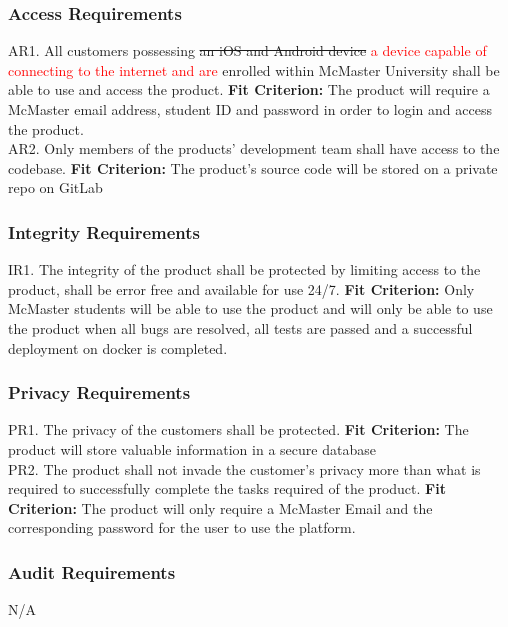 \documentclass[12pt, titlepage]{article}
\begin{document}
\subsubsection{Access Requirements}

AR1. All customers possessing \sout{an iOS and Android device} \textcolor{red}{a device capable of connecting to the internet and are} enrolled within McMaster University shall be able to use and access the product.
	\textbf{Fit Criterion:} The product will require a McMaster email address, student ID and password in order to login and access the product. \\

\noindent AR2. Only members of the products’ development team shall have access to the codebase.
	\textbf{Fit Criterion:} The product’s source code will be stored on a private repo on GitLab

\subsubsection{Integrity Requirements}

IR1. The integrity of the product shall be protected by limiting access to the product, shall be error free and available for use 24/7.
	\textbf{Fit Criterion:} Only McMaster students will be able to use the product and will only be able to use the product when all bugs are resolved, all tests are passed and a successful deployment on docker is completed.

\subsubsection{Privacy Requirements}

PR1. The privacy of the customers shall be protected.
	\textbf{Fit Criterion:} The product will store valuable information in a secure database\\

\noindent PR2. The product shall not invade the customer’s privacy more than what is required to successfully complete the tasks required of the product. 
	\textbf{Fit Criterion:} The product will only require a McMaster Email and the corresponding password for the user to use the platform.

\subsubsection{Audit Requirements}

N/A
\end{document}
